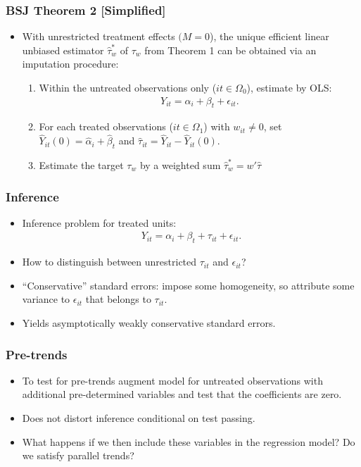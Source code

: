 \documentclass[english,xcolor=svgnames]{beamer}
\begin{document}
\begin{frame}
\frametitle[alignment=center]{BSJ Theorem 2 [Simplified]}
\begin{itemize}
	\item With unrestricted treatment effects $(M=0$), the unique efficient linear unbiased estimator $\hat{\tau}_w^*$ of $\tau_w$ from Theorem 1 can be obtained via an imputation procedure:
	\begin{enumerate}
		\item Within the untreated observations only ($it\in \Omega_0$), estimate by OLS:
		\begin{align*}
			Y_{it} = \alpha_i + \beta_t + \epsilon_{it}.
		\end{align*}
		\item For each treated observations ($it\in \Omega_1$) with $w_{it}\neq 0$, set  $\hat{Y}_{it}(0) = \hat{\alpha}_i + \hat{\beta}_t$ and $\hat{\tau}_{it} = \hat{Y}_{it} - \hat{Y}_{it}(0)$.
		\item Estimate the target $\tau_w$ by a weighted sum $\hat{\tau}_w^*=w'\hat{\tau}$
	\end{enumerate}
\end{itemize}
\end{frame}


\begin{frame}
\frametitle[alignment=center]{Inference}
\begin{itemize}
	\item Inference problem for treated units:
	\begin{align*}
			Y_{it} = \alpha_i + \beta_t + \tau_{it} + \epsilon_{it}.
		\end{align*}
	\item How to distinguish between unrestricted $\tau_{it}$ and $\epsilon_{it}$?
	\item ``Conservative'' standard errors: impose some homogeneity, so attribute some variance to $\epsilon_{it}$ that belongs to $\tau_{it}$.
	\item Yields asymptotically weakly conservative standard errors.
\end{itemize}
\end{frame}

\begin{frame}
\frametitle[alignment=center]{Pre-trends}
\begin{itemize}
	\item To test for pre-trends augment model for untreated observations with additional pre-determined variables and test that the coefficients are zero.
	\item Does not distort inference conditional on test passing.
	\item What happens if we then include these variables in the regression model? Do we satisfy parallel trends?
\end{itemize}
\end{frame}
\end{document}
